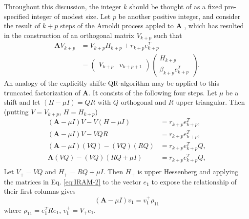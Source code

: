 \documentclass[12pt]{article}
\newcommand{\A}{\mathbf{A}}
\begin{document}
Throughout this discussion, the integer $k$ should be thought of as a fixed pre-specified integer of modest size.  Let $p$ be another positive integer, and consider the result of $k+p$ steps of the Arnoldi process appled to $\A$ , which has resulted in the construction of an orthogonal matrix $V_{k+p}$ such that
\begin{equation}
    \begin{split}
        \A V_{k+p} &= V_{k+p}H_{k+p} + r_{k+p}e_{k+p}^T \\
        &= \begin{pmatrix}V_{k+p} & v_{k+p+1} \end{pmatrix} \begin{pmatrix}H_{k+p} \\ \beta_{k+p}e_{k+p}^T \end{pmatrix}.
    \end{split}
    \label{eq:ArnoldiFactorization-k+p}
\end{equation}
An analogy of the explicitly shifte QR-algorithm may be applied to this truncated factorization of $\A$.  It consists of the following four steps.  Let $\mu$ be a shift and let $\left(H-\mu I\right) = QR$ with $Q$ orthogonal and $R$ upper triangular.  Then (putting $V = V_{k+p}$, $H = H_{k+p}$)
\begin{subequations}\begin{align}
    \left(\A - \mu I\right)V - V\left(H - \mu I\right) &= r_{k+p}e_{k+p}^T, \\
    \left(\A - \mu I\right)V - VQR &= r_{k+p}e_{k+p}^T, \\ \label{eq:IRAM-2}
    \left(\A - \mu I\right)\left(VQ\right) - \left(VQ\right)\left(RQ\right) &= r_{k+p}e_{k+p}^TQ, \\
    \A\left(VQ\right) - \left(VQ\right)\left(RQ + \mu I\right) &= r_{k+p}e_{k+p}^TQ, \\
\end{align}\end{subequations}
Let $V_+ = VQ$ and $H_+ = RQ + \mu I$.  Then $H_+$ is upper Hessenberg and applying the matrices in Eq. \ref{eq:IRAM-2} to the vector $e_1$ to expose the relationship of their first columns gives
\begin{equation}
    \left(\A - \mu I\right)v_1 = v_1^+\rho_{11}
    \label{}
\end{equation}
where $\rho_{11} = e_1^TRe_1$, $v_1^+ = V_+e_1$.
\end{document}
